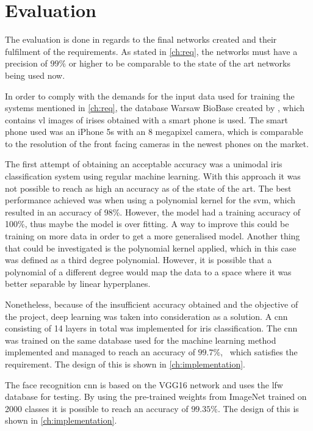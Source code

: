 \chapter{Evaluation}
The evaluation is done in regards to the final networks created and their fulfilment of the requirements. As stated in \autoref{ch:req}, the networks must have a precision of $99\%$ or higher to be comparable to the state of the art networks being used now.

In order to comply with the demands for the input data used for training the systems mentioned in \autoref{ch:req}, the database Warsaw BioBase created by \cite{Trokielewicz2016}, which contains \gls{vl} images of irises obtained with a smart phone is used. The smart phone used was an iPhone 5s with an 8 megapixel camera, which is comparable to the resolution of the front facing cameras in the newest phones on the market. 

The first attempt of obtaining an acceptable accuracy was a unimodal iris classification system using regular machine learning. With this approach it was not possible to reach as high an accuracy as of the state of the art. The best performance achieved was when using a polynomial kernel for the \gls{svm}, which resulted in an accuracy of 98\%. However, the model had a training accuracy of 100\%, thus maybe the model is over fitting. A way to improve this could be training on more data in order to get a more generalised model. Another thing that could be investigated is the polynomial kernel applied, which in this case was defined as a third degree polynomial. However, it is possible that a polynomial of a different degree would map the data to a space where it was better separable by linear hyperplanes. 

Nonetheless, because of the insufficient accuracy obtained and the objective of the project, deep learning was taken into consideration as a solution. A \gls{cnn} consisting of 14 layers in total was implemented for iris classification. The \gls{cnn} was trained on the same database used for the machine learning method implemented and managed to reach an accuracy of $99.7\%$, ~which satisfies the requirement. The design of this is shown in \autoref{ch:implementation}.

The face recognition \gls{cnn} is based on the VGG16 network and uses the \gls{lfw} database for testing. By using the pre-trained weights from ImageNet trained on 2000 classes it is possible to reach an accuracy of $99.35\%$. The design of this is shown in \autoref{ch:implementation}.	


